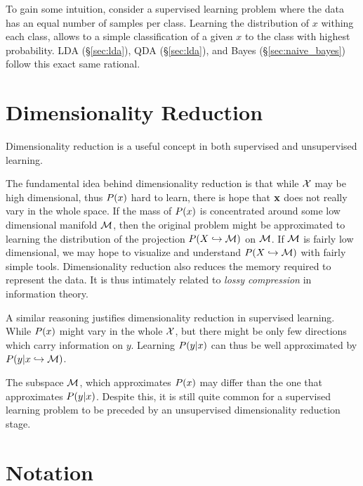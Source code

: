 To gain some intuition, consider a supervised learning problem where the data has an equal number of samples per class. 
Learning the distribution of $x$ withing each class, allows to a simple classification of a given $x$ to the class with highest probability. LDA (\S\ref{sec:lda}), QDA (\S\ref{sec:lda}), and \Naive Bayes (\S\ref{sec:naive_bayes}) follow this exact same rational.





\chapter{Dimensionality Reduction}
\label{apx:dim_reduce}

Dimensionality reduction is a useful concept in both supervised and unsupervised learning. 

The fundamental idea behind dimensionality reduction is that while $\mathcal{X}$ may be high dimensional, thus $P(x)$ hard to learn, there is hope that $\mathbf{x}$ does not really vary in the whole space. 
If the mass of $P(x)$ is concentrated around some low dimensional manifold $\mathcal{M}$, then the original problem might be approximated to learning the distribution of the projection $P(X \hookrightarrow \mathcal{M})$ on $\mathcal{M}$. 
If $\mathcal{M}$ is fairly low dimensional, we may hope to visualize and understand $P(X \hookrightarrow \mathcal{M})$ with fairly simple tools.
Dimensionality reduction also reduces the memory required to represent the data. It is thus intimately related to \emph{lossy compression} in information theory.

A similar reasoning justifies dimensionality reduction in supervised learning. 
While $P(x)$ might vary in the whole $\mathcal{X}$, but there might be only few directions which carry information on $y$. Learning $P(y|x)$ can thus be well approximated by $P(y|x \hookrightarrow \mathcal{M})$.


\begin{remark}
The subspace $\mathcal{M}$, which approximates $P(x)$ may differ than the one that approximates $P(y|x)$. Despite this, it is still quite common for a supervised learning problem to be preceded by an unsupervised dimensionality reduction stage.
\end{remark}




\chapter{Notation}
\label{apx:notation}

